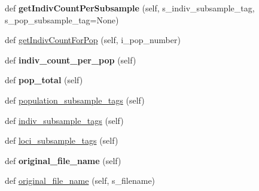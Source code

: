 \begin{DoxyCompactItemize}
\item 
def {\bfseries get\+Indiv\+Count\+Per\+Subsample} (self, s\+\_\+indiv\+\_\+subsample\+\_\+tag, s\+\_\+pop\+\_\+subsample\+\_\+tag=None)\hypertarget{classnegui_1_1genepopfilemanager_1_1GenepopFileManager_a1d958ee7a75b8115c605a1aae8da68f2}{}\label{classnegui_1_1genepopfilemanager_1_1GenepopFileManager_a1d958ee7a75b8115c605a1aae8da68f2}

\item 
def \hyperlink{classnegui_1_1genepopfilemanager_1_1GenepopFileManager_aa32ff63901f23fbbf10bb9f4ddf5898b}{get\+Indiv\+Count\+For\+Pop} (self, i\+\_\+pop\+\_\+number)
\item 
def {\bfseries indiv\+\_\+count\+\_\+per\+\_\+pop} (self)\hypertarget{classnegui_1_1genepopfilemanager_1_1GenepopFileManager_a1c59dc89fd0edb6dc377a21211e4bf00}{}\label{classnegui_1_1genepopfilemanager_1_1GenepopFileManager_a1c59dc89fd0edb6dc377a21211e4bf00}

\item 
def {\bfseries pop\+\_\+total} (self)\hypertarget{classnegui_1_1genepopfilemanager_1_1GenepopFileManager_afeefa4552274231bedce1fc6b8c0532d}{}\label{classnegui_1_1genepopfilemanager_1_1GenepopFileManager_afeefa4552274231bedce1fc6b8c0532d}

\item 
def \hyperlink{classnegui_1_1genepopfilemanager_1_1GenepopFileManager_ac3210c8f51c32e9e99e34703afb402d0}{population\+\_\+subsample\+\_\+tags} (self)
\item 
def \hyperlink{classnegui_1_1genepopfilemanager_1_1GenepopFileManager_ae77bd8c465db4d95839db838c236f4cd}{indiv\+\_\+subsample\+\_\+tags} (self)
\item 
def \hyperlink{classnegui_1_1genepopfilemanager_1_1GenepopFileManager_a9818ed890508a24026ea37fa734c898e}{loci\+\_\+subsample\+\_\+tags} (self)
\item 
def {\bfseries original\+\_\+file\+\_\+name} (self)\hypertarget{classnegui_1_1genepopfilemanager_1_1GenepopFileManager_a8145be8434d89aa7011831f6a6ca19a3}{}\label{classnegui_1_1genepopfilemanager_1_1GenepopFileManager_a8145be8434d89aa7011831f6a6ca19a3}

\item 
def \hyperlink{classnegui_1_1genepopfilemanager_1_1GenepopFileManager_abec8e261bad014e6488162ec43e63ef7}{original\+\_\+file\+\_\+name} (self, s\+\_\+filename)
\end{DoxyCompactItemize}


